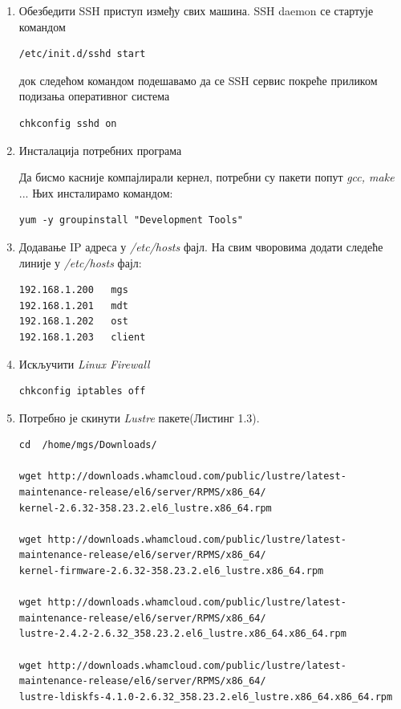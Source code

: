 \begin{enumerate}
\item  Обезбедити SSH приступ између свих машина. 
SSH daemon се стартује командом
\begin{verbatim}
/etc/init.d/sshd start
\end{verbatim}
док следећом командом подешавамо да се  SSH сервис покреће приликом подизања оперативног система
\begin{verbatim}
chkconfig sshd on
\end{verbatim}

\item Инсталација потребних програма

Да бисмо касније компајлирали кернел, потребни су пакети попут \textit{gcc, make} ... Њих инсталирамо командом:

\begin{verbatim}
yum -y groupinstall "Development Tools"
\end{verbatim}

\item Додавање  IP адреса у \textit{/etc/hosts} фајл. На свим чворовима додати следеће линије у \textit{/etc/hosts} фајл:
\begin{verbatim}
192.168.1.200   mgs
192.168.1.201   mdt
192.168.1.202   ost
192.168.1.203   client
\end{verbatim}

\item  Искључити  \textit{Linux Firewall}
\begin{verbatim}
chkconfig iptables off
\end{verbatim}

\item Потребно је скинути    \textit{Lustre} пакете(Листинг 1.3).
\begin{lstlisting}[style=nonumbers,frame=single, caption= \textit{Lustre} пакетi]
cd  /home/mgs/Downloads/

wget http://downloads.whamcloud.com/public/lustre/latest-maintenance-release/el6/server/RPMS/x86_64/
kernel-2.6.32-358.23.2.el6_lustre.x86_64.rpm

wget http://downloads.whamcloud.com/public/lustre/latest-maintenance-release/el6/server/RPMS/x86_64/
kernel-firmware-2.6.32-358.23.2.el6_lustre.x86_64.rpm

wget http://downloads.whamcloud.com/public/lustre/latest-maintenance-release/el6/server/RPMS/x86_64/
lustre-2.4.2-2.6.32_358.23.2.el6_lustre.x86_64.x86_64.rpm

wget http://downloads.whamcloud.com/public/lustre/latest-maintenance-release/el6/server/RPMS/x86_64/
lustre-ldiskfs-4.1.0-2.6.32_358.23.2.el6_lustre.x86_64.x86_64.rpm


\end{lstlisting}
\end{enumerate}
